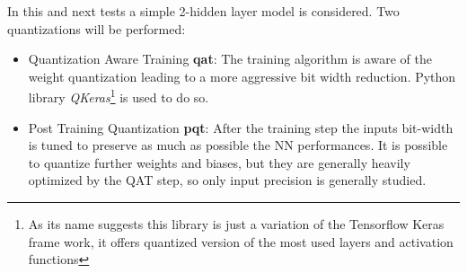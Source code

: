 \documentclass[../../main.tex]{subfiles}
\begin{document}
In this and next tests a simple 2-hidden layer model is considered. Two quantizations will be performed:
\begin{itemize}
    \item Quantization Aware Training \textbf{\acrshort{qat}}: The training algorithm is aware of the weight quantization leading to a more aggressive bit width reduction. Python library \textit{QKeras}\cite{qkeras}\footnote{As its name suggests this library is just a variation of the Tensorflow Keras frame work, it offers quantized version of the most used layers and activation functions} is used to do so.
    \item Post Training Quantization \textbf{\acrshort{pqt}}: After the training step the inputs bit-width is tuned to preserve as much as possible the NN performances. It is possible to quantize further weights and biases, but they are generally heavily optimized by the QAT step, so only input precision is generally studied.
\end{itemize}
\end{document}
